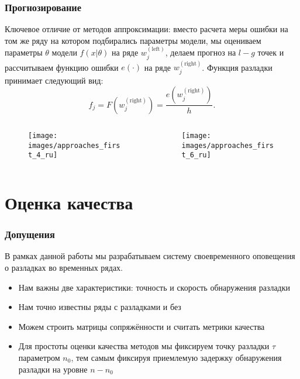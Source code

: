 \documentclass[intlimits, 9pt, unicode]{beamer}
\begin{document}
\begin{frame}
    \frametitle{Прогнозирование}


Ключевое отличие от методов аппроксимации: вместо расчета меры ошибки на том же ряду на котором подбирались параметры модели, мы оцениваем параметры $\theta$ модели $f(x|\theta)$ на ряде $ w_j^{\mathrm{(left)}} $, делаем прогноз на $ l - g $ точек и рассчитываем функцию ошибки $ e(\cdot) $ на ряде $ w_j^{\mathrm{(right)}} $. Функция разладки принимает следующий вид:
	\begin{equation*}
	 f_j = F(w_j^{\mathrm{(right)}}) = \frac{e(w_j^{\mathrm{(right)}})}{h}.
	 \end{equation*}

\begin{columns}
    \begin{column}{0.5\textwidth}
	\begin{figure}
	\texttt{[image: images/approaches\_first\_4\_ru]}
	\end{figure}
     \end{column}
    \begin{column}{0.5\textwidth}
	\begin{figure}
	\texttt{[image: images/approaches\_first\_6\_ru]}
	\end{figure}
     \end{column}
     \end{columns}

\end{frame}

\section{Оценка качества}

\begin{frame}
    \frametitle{Допущения}

В рамках данной работы мы разрабатываем систему своевременного оповещения о разладках во временных рядах.

\begin{itemize}
	\item Нам важны две характеристики: точность и скорость обнаружения разладки
	\item Нам точно известны ряды с разладками и без
	\item Можем строить матрицы сопряжённости и считать метрики качества
	\item Для простоты оценки качества методов мы фиксируем точку разладки $\tau$ параметром $n_0$, тем самым фиксируя приемлемую задержку обнаружения разладки на уровне $n - n_0$
\end{itemize}

\end{frame}
\end{document}
